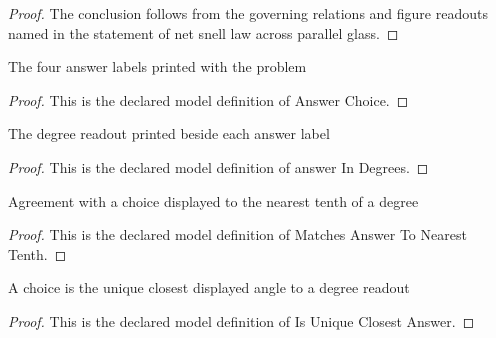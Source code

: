 \begin{proof}
  The conclusion follows from the governing relations and figure readouts named in the statement of net snell law across parallel glass.
\end{proof}
\begin{definition}
  \label{def:physics:phyx-mini-0143:phyxminiproblems-problemphyxmini0143-answerchoice}
  The four answer labels printed with the problem
\end{definition}
\begin{proof}
  This is the declared model definition of Answer Choice.
\end{proof}
\begin{definition}
  \label{def:physics:phyx-mini-0143:phyxminiproblems-problemphyxmini0143-answerindegrees}
  The degree readout printed beside each answer label
\end{definition}
\begin{proof}
  This is the declared model definition of answer In Degrees.
\end{proof}
\begin{definition}
  \label{def:physics:phyx-mini-0143:phyxminiproblems-problemphyxmini0143-matchesanswertonearesttenth}
  Agreement with a choice displayed to the nearest tenth of a degree
\end{definition}
\begin{proof}
  This is the declared model definition of Matches Answer To Nearest Tenth.
\end{proof}
\begin{definition}
  \label{def:physics:phyx-mini-0143:phyxminiproblems-problemphyxmini0143-isuniqueclosestanswer}
  A choice is the unique closest displayed angle to a degree readout
\end{definition}
\begin{proof}
  This is the declared model definition of Is Unique Closest Answer.
\end{proof}
